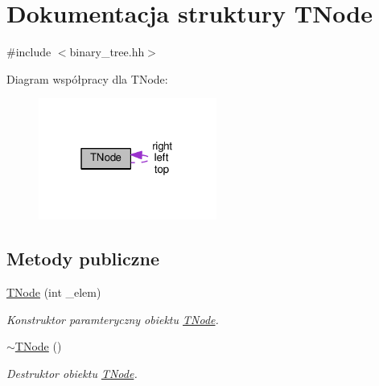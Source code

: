 \hypertarget{struct_t_node}{\section{Dokumentacja struktury T\-Node}
\label{struct_t_node}
}


{\ttfamily \#include $<$binary\-\_\-tree.\-hh$>$}



Diagram współpracy dla T\-Node\-:\nopagebreak
\begin{figure}[H]
\begin{center}
\leavevmode
\includegraphics[width=166pt]{struct_t_node__coll__graph}
\end{center}
\end{figure}
\subsection*{Metody publiczne}
\begin{DoxyCompactItemize}
\item 
\hyperlink{struct_t_node_a8681e0920f2e2ba9fab62fcb735b6c8b}{T\-Node} (int \-\_\-elem)
\begin{DoxyCompactList}\small\item\em Konstruktor paramteryczny obiektu \hyperlink{struct_t_node}{T\-Node}. \end{DoxyCompactList}\item 
\hyperlink{struct_t_node_a374606795ee14fe9a6df10dec491d799}{$\sim$\-T\-Node} ()
\begin{DoxyCompactList}\small\item\em Destruktor obiektu \hyperlink{struct_t_node}{T\-Node}. \end{DoxyCompactList}\end{DoxyCompactItemize}
